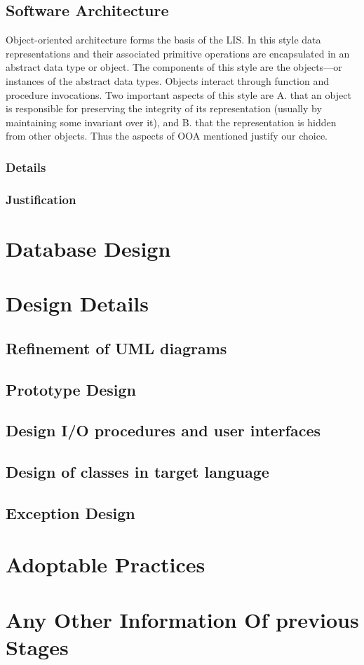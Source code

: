 \documentclass{article}
\begin{document}
\subsection{Software Architecture}
Object-oriented architecture forms the basis of the LIS. In this style data representations and
their associated primitive operations are encapsulated in an abstract data type or object. The components of this style are the objects—or instances of the abstract data types. Objects interact through function and procedure invocations.
Two important aspects of this style are
A. that an object is responsible for preserving the integrity of its representation (usually by
maintaining some invariant over it), and
B. that the representation is hidden from other objects.
Thus the aspects of OOA mentioned justify our choice.
\subsubsection{Details}
\subsubsection{Justification}

\section{Database Design}

\section{Design Details}
\subsection{Refinement of UML diagrams}
\subsection{Prototype Design}
\subsection{Design I/O procedures and user interfaces}
\subsection{Design of classes in target language}
\subsection{Exception Design}

\section{Adoptable Practices}

\section{Any Other Information Of previous Stages}
\end{document}
